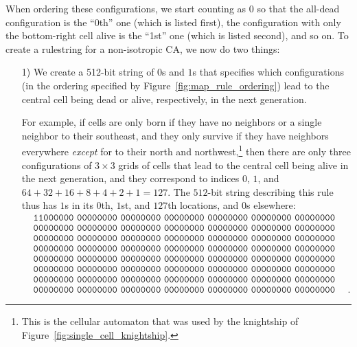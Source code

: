 When ordering these configurations, we start counting as $0$ so that the all-dead configuration is the ``0th'' one (which is listed first), the configuration with only the bottom-right cell alive is the ``1st'' one (which is listed second), and so on. To create a rulestring for a non-isotropic CA, we now do two things:\smallskip

\begin{itemize}
	\item[1)] We create a 512-bit string of $0$s and $1$s that specifies which configurations (in the ordering specified by Figure~\ref{fig:map_rule_ordering}) lead to the central cell being dead or alive, respectively, in the next generation.
	
	For example, if cells are only born if they have no neighbors or a single neighbor to their southeast, and they only survive if they have neighbors everywhere \emph{except} for to their north and northwest,\footnote{This is the cellular automaton that was used by the knightship of Figure~\ref{fig:single_cell_knightship}.} then there are only three configurations of $3 \times 3$ grids of cells that lead to the central cell being alive in the next generation, and they correspond to indices $0$, $1$, and $64+32+16+8+4+2+1=127$. The $512$-bit string describing this rule thus has $1$s in its $0$th, $1$st, and $127$th locations, and $0$s elsewhere:
	\begin{align*}
		& \texttt{11000000 00000000 00000000 00000000 00000000 00000000 00000000 00000000} \\
		& \texttt{00000000 00000000 00000000 00000000 00000000 00000000 00000000 00000001} \\
		& \texttt{00000000 00000000 00000000 00000000 00000000 00000000 00000000 00000000} \\
		& \texttt{00000000 00000000 00000000 00000000 00000000 00000000 00000000 00000000} \\
		& \texttt{00000000 00000000 00000000 00000000 00000000 00000000 00000000 00000000} \\
		& \texttt{00000000 00000000 00000000 00000000 00000000 00000000 00000000 00000000} \\
		& \texttt{00000000 00000000 00000000 00000000 00000000 00000000 00000000 00000000} \\
		& \texttt{00000000 00000000 00000000 00000000 00000000 00000000 00000000 00000000}.
	\end{align*}
	

\end{itemize}
